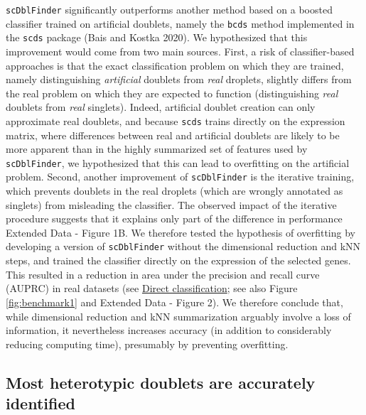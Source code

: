 \documentclass[10pt,a4paper,twocolumn]{article}
\begin{document}
\texttt{scDblFinder} significantly outperforms another method based on a boosted classifier trained on artificial doublets, namely the \texttt{bcds} method implemented in the \texttt{scds} package (Bais and Kostka 2020).
We hypothesized that this improvement would come from two main sources.
First, a risk of classifier-based approaches is that the exact classification problem on which they are trained, namely distinguishing \emph{artificial} doublets from \emph{real} droplets, slightly differs from the real problem on which they are expected to function (distinguishing \emph{real} doublets from \emph{real} singlets).
Indeed, artificial doublet creation can only approximate real doublets, and because \texttt{scds} trains directly on the expression matrix, where differences between real and artificial doublets are likely to be more apparent than in the highly summarized set of features used by \texttt{scDblFinder}, we hypothesized that this can lead to overfitting on the artificial problem.
Second, another improvement of \texttt{scDblFinder} is the iterative training, which prevents doublets in the real droplets (which are wrongly annotated as singlets) from misleading the classifier.
The observed impact of the iterative procedure suggests that it explains only part of the difference in performance Extended Data - Figure 1B. We therefore tested the hypothesis of overfitting by developing a version of \texttt{scDblFinder} without the dimensional reduction and kNN steps, and trained the classifier directly on the expression of the selected genes.
This resulted in a reduction in area under the precision and recall curve (AUPRC) in real datasets (see \protect\hyperlink{direct-classification}{Direct classification}; see also Figure \ref{fig:benchmark1} and Extended Data - Figure 2).
We therefore conclude that, while dimensional reduction and kNN summarization arguably involve a loss of information, it nevertheless increases accuracy (in addition to considerably reducing computing time), presumably by preventing overfitting.

\subsection{Most heterotypic doublets are accurately identified}
\end{document}

